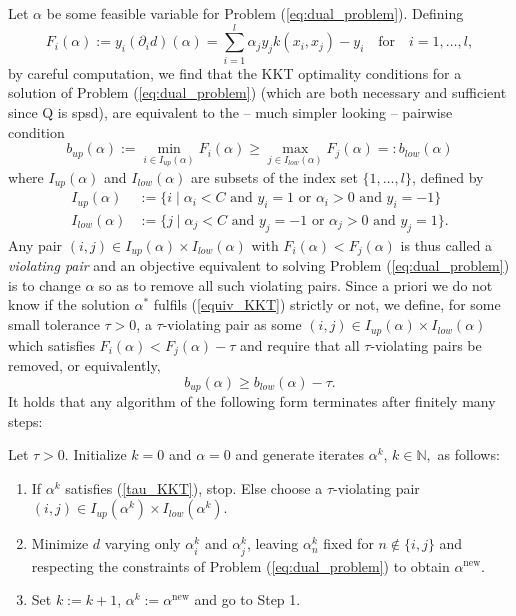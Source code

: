 Let $\alpha$ be some feasible variable for Problem (\ref{eq:dual_problem}). Defining
\begin{equation}
F_i(\alpha) := y_i (\partial_i d)(\alpha) = \sum_{i = 1}^l \alpha_j y_j k(x_i,x_j) - y_i \quad \text{for} \quad i = 1,\ldots,l,
\end{equation}
by careful computation, we find that the KKT optimality conditions for a solution of Problem (\ref{eq:dual_problem}) (which are both necessary and sufficient since Q is spsd), are equivalent to the -- much simpler looking -- pairwise condition
\begin{equation}\label{equiv_KKT}
b_{up}(\alpha) := \min_{i \in I_{up}(\alpha)} F_i(\alpha) \geq \max_{j \in I_{low}(\alpha)} F_j(\alpha) =: b_{low}(\alpha)
\end{equation}
where $I_{up}(\alpha)$ and $I_{low}(\alpha)$ are subsets of the index set $\{1,\ldots,l\}$, defined by
\begin{align}
I_{up}(\alpha) &:= \{ i  \mid  \alpha_i < C \text{ and } y_i = 1 \text{ or } \alpha_i > 0 \text{ and } y_i = -1 \} \\
I_{low}(\alpha) &:= \{ j \mid \alpha_j < C \text{ and } y_j = -1 \text{ or } \alpha_j > 0 \text{ and } y_j = 1 \}.
\end{align} 
Any pair $(i,j) \in I_{up}(\alpha) \times I_{low}(\alpha)$ with $F_i(\alpha) < F_j(\alpha)$ is thus called a \textit{violating pair} and an objective equivalent to solving Problem (\ref{eq:dual_problem}) is to change $\alpha$ so as to remove all such violating pairs. Since a priori we do not know if the solution $\alpha^*$ fulfils (\ref{equiv_KKT}) strictly or not, we define, for some small tolerance $\tau > 0$, a $\tau$-violating pair as some $(i,j) \in I_{up}(\alpha) \times I_{low}(\alpha)$ which satisfies $F_i(\alpha) < F_j(\alpha) - \tau$ and require that all $\tau$-violating pairs be removed, or equivalently, 
\begin{equation}\label{tau_KKT}
b_{up}(\alpha) \geq b_{low}(\alpha) - \tau.
\end{equation}
It holds that any algorithm of the following form terminates after finitely many steps:
\begin{algorithm}\label{GSMO} Let $\tau > 0$. Initialize $k = 0 $ and $\alpha = 0$ and generate iterates $\alpha^k$, $k \in \mathbb{N},$ as follows: 
\begin{enumerate}
\item If $\alpha^k$ satisfies (\ref{tau_KKT}), stop. Else choose a $\tau$-violating pair $(i,j) \in I_{up}(\alpha^k) \times I_{low}(\alpha^k)$.
\item Minimize $d$ varying only $\alpha^k_i$ and $\alpha^k_j$, leaving $\alpha^k_n$ fixed for $n \notin \{i,j\}$ and respecting the constraints of Problem (\ref{eq:dual_problem}) to obtain $\alpha^{\text{new}}$.
\item Set $k := k+1$, $\alpha^k := \alpha^{\text{new}}$ and go to Step 1.
\end{enumerate}
\end{algorithm} 
